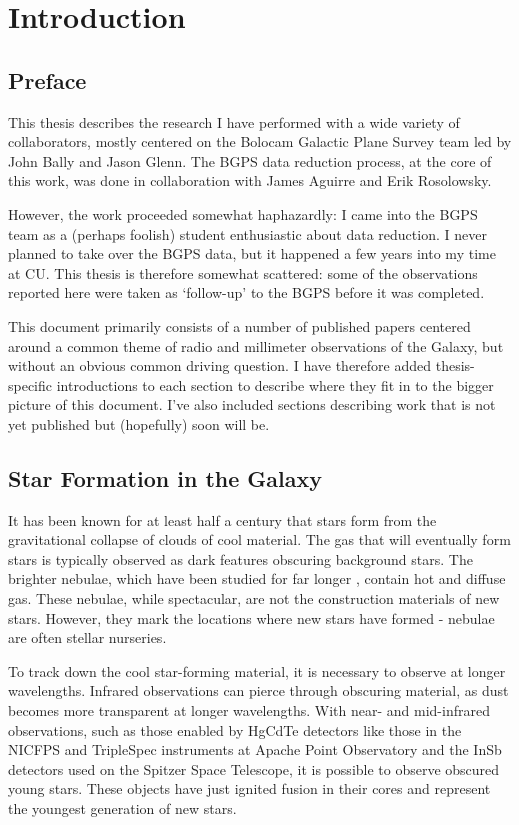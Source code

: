 
\chapter{Introduction}
\section{Preface}
This thesis describes
the research I have performed with a wide variety of collaborators, mostly
centered on the Bolocam Galactic Plane Survey team led by John Bally and Jason
Glenn.  The BGPS data reduction process, at the core of this work, was done in 
collaboration with James Aguirre and Erik Rosolowsky.

However, the work proceeded somewhat haphazardly: I came into the BGPS team as
a (perhaps foolish) student enthusiastic about data reduction.  I never planned to take
over the BGPS data, but it happened a few years into my time at CU.  This
thesis is therefore somewhat scattered: some of the observations reported here
were taken as `follow-up' to the BGPS before it was completed.

This document primarily consists of a number of published papers centered
around a common theme of radio and millimeter observations of the Galaxy, but
without an obvious common driving question.  I have therefore added
thesis-specific introductions to each section to describe where they fit in to
the bigger picture of this document.  I've also included sections describing
work that is not yet published but (hopefully) soon will be.

\section{Star Formation in the Galaxy}
It has been known for at least half a century that stars form from the
gravitational collapse of clouds of cool material.  The gas that will
eventually form stars is typically observed as dark features obscuring
background stars.  The brighter nebulae, which have been studied for far longer
\citep{Messier1764}, contain hot and diffuse gas.  These nebulae, while
spectacular, are not the construction materials of new stars.  However,
they mark the locations where new stars have formed - nebulae are often
stellar nurseries.

To track down the cool star-forming material, it is necessary to observe at
longer wavelengths.  Infrared observations can pierce through obscuring
material, as dust becomes more transparent at longer wavelengths.  With near-
and mid-infrared observations, such as those enabled by HgCdTe detectors like
those in the NICFPS and TripleSpec instruments at Apache Point Observatory and
the InSb detectors used on the Spitzer Space Telescope, it is possible to
observe obscured young stars.  These objects have just ignited fusion in their
cores and represent the youngest generation of new stars.

